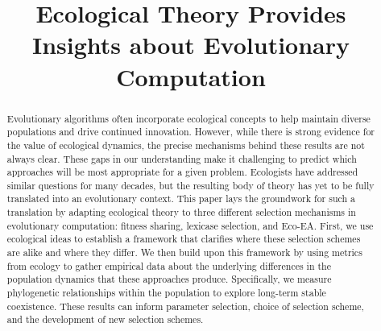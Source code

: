 \documentclass[sigconf]{acmart}
\begin{document}
\title{Ecological Theory Provides Insights about Evolutionary Computation}







\begin{abstract}
Evolutionary algorithms often incorporate ecological concepts to help maintain diverse populations and drive continued innovation. However, while there is strong evidence for the value of ecological dynamics, the precise mechanisms behind these results are not always clear. These gaps in our understanding make it challenging to predict which approaches will be most appropriate for a given problem. Ecologists have addressed similar questions for many decades, but the resulting body of theory has yet to be fully translated into an evolutionary context. This paper lays the groundwork for such a translation by adapting ecological theory to three different selection mechanisms in evolutionary computation: fitness sharing, lexicase selection, and Eco-EA. First, we use ecological ideas to establish a framework that clarifies where these selection schemes are alike and where they differ. We then build upon this framework by using metrics from ecology to gather empirical data about the underlying differences in the population dynamics that these approaches produce. Specifically, we measure phylogenetic relationships within the population to explore long-term stable coexistence. These results can inform parameter selection, choice of selection scheme, and the development of new selection schemes.

\end{abstract}
\end{document}
